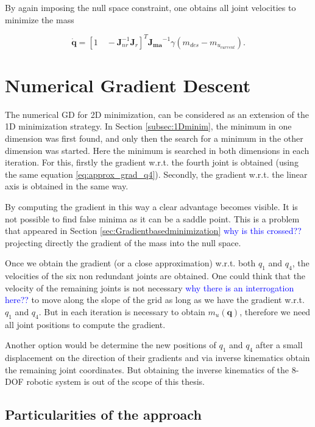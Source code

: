 By again imposing the null space constraint, one obtains all joint velocities to minimize the mass

\begin{equation}
\mathbf{\dot{q}} = [1\quad  -\mathbf{J}_{nr}^{-1} \mathbf{J}_r]^T   \mathbf{J_{ma}}^{-1} \gamma (m_{des} - m_{u_{current}})  .
\end{equation}





\section{Numerical Gradient Descent}
\label{sec:numerical}

The numerical GD for 2D minimization, can be considered as an extension of the 1D minimization strategy. In Section \ref{subsec:1Dminim}, the minimum in one dimension was first found, and only then the search for a minimum in the other dimension was started. Here the minimum is searched in both dimensions in each iteration. For this, firstly the gradient w.r.t. the fourth joint is obtained (using the same equation \ref{eq:approx_grad_q4}). Secondly, the gradient w.r.t. the linear axis is obtained in the same way. 

By computing the gradient in this way a clear advantage becomes visible. It is not possible to find false minima as it can be a saddle point. This is a problem that appeared in Section \ref{sec:Gradientbasedminimization} \textcolor{blue}{why is this crossed?? } projecting directly the gradient of the mass into the null space.


Once we obtain the gradient (or a close approximation) w.r.t. both $q_1$ and $q_4$, the velocities of the six non redundant joints are obtained. One could think that the velocity of the remaining joints is not necessary \textcolor{blue}{why there is an interrogation here??} to move along the slope of the grid as long as we have the gradient w.r.t. $q_1$ and $q_4$. But in each iteration is necessary to obtain $m_u(\mathbf{q})$, therefore we need all joint positions to compute the gradient.  

Another option would be determine the new positions of $q_1$ and $q_4$ after a small displacement on the direction of their gradients and via inverse kinematics obtain the remaining joint coordinates. But obtaining the inverse kinematics of the 8-DOF robotic system is out of the scope of this thesis.

\subsection{Particularities of the approach}

